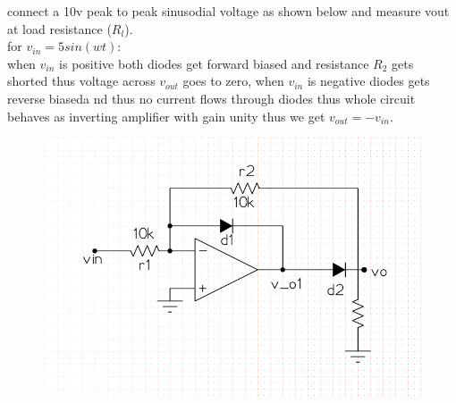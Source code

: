 \documentclass[12pt]{article}
\begin{document}
connect a 10v peak to peak sinusodial voltage as shown below and measure vout at load resistance (\(R_{l}\)).\\
for \(v_{in}=5sin(wt)\):\\
when \(v_{in}\) is positive both diodes get forward biased and resistance \(R_{2}\) gets shorted thus voltage across \(v_{out}\) goes to zero, when \(v_{in}\) is negative diodes gets reverse biaseda nd thus no current flows through diodes thus whole circuit behaves as inverting amplifier with gain unity thus we get \(v_{out} = -v_{in}\).  
 \begin{figure}[h!]
\centering
\includegraphics[scale = 0.6]{half_wave_rectifier.png}
\end{figure}
\newpage

 
\end{document}
